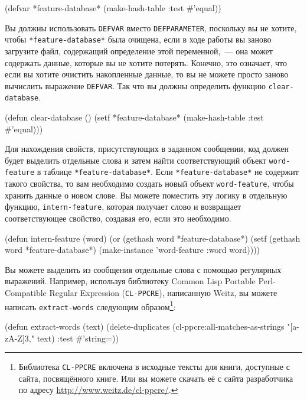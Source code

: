 \begin{myverb}
(defvar *feature-database* (make-hash-table :test #'equal))
\end{myverb}

Вы должны использовать \lstinline{DEFVAR} вместо \lstinline{DEFPARAMETER}, поскольку вы не хотите,
чтобы \lstinline{*feature-database*} была очищена, если в ходе работы вы заново загрузите файл,
содержащий определение этой переменной,~--- она может содержать данные, которые вы не
хотите потерять.  Конечно, это означает, что если вы хотите очистить накопленные данные,
то вы не можете просто заново вычислить выражение \lstinline{DEFVAR}.  Так что вы должны
определить функцию \lstinline{clear-database}.

\begin{myverb}
(defun clear-database ()
  (setf *feature-database* (make-hash-table :test #'equal)))
\end{myverb}

Для нахождения свойств, присутствующих в заданном сообщении, код должен будет выделить
отдельные слова и затем найти соответствующий объект \lstinline{word-feature} в таблице
\lstinline{*feature-database*}.  Если \lstinline{*feature-database*} не содержит такого свойства, то вам
необходимо создать новый объект \lstinline{word-feature}, чтобы хранить данные о новом слове.  Вы
можете поместить эту логику в отдельную функцию, \lstinline{intern-feature}, которая получает
слово и возвращает соответствующее свойство, создавая его, если это необходимо.

\begin{myverb}
(defun intern-feature (word)
  (or (gethash word *feature-database*)
      (setf (gethash word *feature-database*)
            (make-instance 'word-feature :word word))))
\end{myverb}

Вы можете выделить из сообщения отдельные слова с помощью регулярных выражений.  Например,
используя библиотеку Common Lisp Portable Perl-Compatible Regular Expression
(\lstinline{CL-PPCRE}), написанную Weitz, вы можете написать \lstinline{extract-words} следующим
образом\footnote{Библиотека \lstinline{CL-PPCRE} включена в исходные тексты для книги,
  доступные с сайта, посвящённого книге.  Или вы можете скачать её с сайта разработчика по
  адресу \url{http://www.weitz.de/cl-ppcre/}.}\hspace{\footnotenegspace}:

\begin{myverb}
(defun extract-words (text)
  (delete-duplicates
   (cl-ppcre:all-matches-as-strings "[a-zA-Z]{3,}" text)
   :test #'string=))
\end{myverb}

